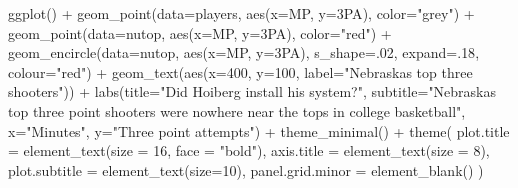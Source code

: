 \documentclass[
]{book}
\newenvironment{Shaded}{\begin{snugshade}}{\end{snugshade}}
\newcommand{\AttributeTok}[1]{\textcolor[rgb]{0.77,0.63,0.00}{#1}}
\newcommand{\DecValTok}[1]{\textcolor[rgb]{0.00,0.00,0.81}{#1}}
\newcommand{\FunctionTok}[1]{\textcolor[rgb]{0.00,0.00,0.00}{#1}}
\newcommand{\NormalTok}[1]{#1}
\newcommand{\SpecialCharTok}[1]{\textcolor[rgb]{0.00,0.00,0.00}{#1}}
\newcommand{\StringTok}[1]{\textcolor[rgb]{0.31,0.60,0.02}{#1}}
\begin{document}
\begin{Shaded}
\begin{Highlighting}[]
\FunctionTok{ggplot}\NormalTok{() }\SpecialCharTok{+} \FunctionTok{geom\_point}\NormalTok{(}\AttributeTok{data=}\NormalTok{players, }\FunctionTok{aes}\NormalTok{(}\AttributeTok{x=}\NormalTok{MP, }\AttributeTok{y=}\StringTok{\textasciigrave{}}\AttributeTok{3PA}\StringTok{\textasciigrave{}}\NormalTok{), }\AttributeTok{color=}\StringTok{"grey"}\NormalTok{) }\SpecialCharTok{+} \FunctionTok{geom\_point}\NormalTok{(}\AttributeTok{data=}\NormalTok{nutop, }\FunctionTok{aes}\NormalTok{(}\AttributeTok{x=}\NormalTok{MP, }\AttributeTok{y=}\StringTok{\textasciigrave{}}\AttributeTok{3PA}\StringTok{\textasciigrave{}}\NormalTok{), }\AttributeTok{color=}\StringTok{"red"}\NormalTok{) }\SpecialCharTok{+} \FunctionTok{geom\_encircle}\NormalTok{(}\AttributeTok{data=}\NormalTok{nutop, }\FunctionTok{aes}\NormalTok{(}\AttributeTok{x=}\NormalTok{MP, }\AttributeTok{y=}\StringTok{\textasciigrave{}}\AttributeTok{3PA}\StringTok{\textasciigrave{}}\NormalTok{), }\AttributeTok{s\_shape=}\NormalTok{.}\DecValTok{02}\NormalTok{, }\AttributeTok{expand=}\NormalTok{.}\DecValTok{18}\NormalTok{, }\AttributeTok{colour=}\StringTok{"red"}\NormalTok{) }\SpecialCharTok{+}
  \FunctionTok{geom\_text}\NormalTok{(}\FunctionTok{aes}\NormalTok{(}\AttributeTok{x=}\DecValTok{400}\NormalTok{, }\AttributeTok{y=}\DecValTok{100}\NormalTok{, }\AttributeTok{label=}\StringTok{"Nebraska\textquotesingle{}s top three shooters"}\NormalTok{)) }\SpecialCharTok{+} 
  \FunctionTok{labs}\NormalTok{(}\AttributeTok{title=}\StringTok{"Did Hoiberg install his system?"}\NormalTok{, }\AttributeTok{subtitle=}\StringTok{"Nebraska\textquotesingle{}s top three point shooters were nowhere near the tops in college basketball"}\NormalTok{, }\AttributeTok{x=}\StringTok{"Minutes"}\NormalTok{, }\AttributeTok{y=}\StringTok{"Three point attempts"}\NormalTok{) }\SpecialCharTok{+} 
  \FunctionTok{theme\_minimal}\NormalTok{() }\SpecialCharTok{+} 
  \FunctionTok{theme}\NormalTok{(}
    \AttributeTok{plot.title =} \FunctionTok{element\_text}\NormalTok{(}\AttributeTok{size =} \DecValTok{16}\NormalTok{, }\AttributeTok{face =} \StringTok{"bold"}\NormalTok{),}
    \AttributeTok{axis.title =} \FunctionTok{element\_text}\NormalTok{(}\AttributeTok{size =} \DecValTok{8}\NormalTok{), }
    \AttributeTok{plot.subtitle =} \FunctionTok{element\_text}\NormalTok{(}\AttributeTok{size=}\DecValTok{10}\NormalTok{), }
    \AttributeTok{panel.grid.minor =} \FunctionTok{element\_blank}\NormalTok{()}
\NormalTok{    )}
\end{Highlighting}
\end{Shaded}
\end{document}
